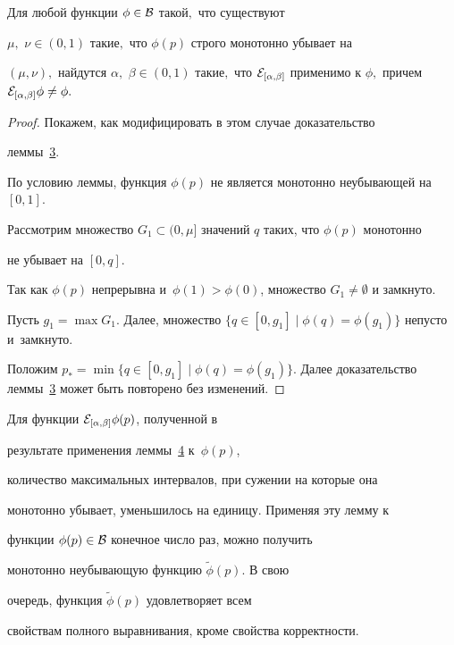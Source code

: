 \smallskip



\hypertarget{palin:lemma4}{}



\begin{lemma}[4]Для любой функции $\phi\in{\cal B}$ такой$,$ что существуют

$\mu,$ $\nu\in(0,1)$ такие$,$ что $\phi(p)$ строго монотонно убывает на

$(\mu,\nu),$ найдутся $\alpha,$ $\beta\in(0,1)$ такие$,$ что ${\cal E}_{[\alpha,\beta]}$ применимо к $\phi,$ причем ${\cal E}_{[\alpha,\beta]}\phi\ne\phi.$

\end{lemma}



\smallskip



\begin{proof} Покажем, как модифицировать в этом случае доказательство

леммы~\hyperlink{palin:lemma3}{3}. 

По условию леммы, функция $\phi(p)$ не является монотонно неубывающей на $[0,1]$. 

Рассмотрим множество $G_1\subset(0,\mu]$ значений $q$ таких, что $\phi(p)$ монотонно

не убывает на $[0,q]$. 

Так как $\phi(p)$ непрерывна и~$\phi(1)>\phi(0)$, множество $G_1\ne\emptyset$ и замкнуто. 



Пусть $g_1=\max G_1$. Далее, множество $\{q\in[0,g_1]\mid \phi(q)=\phi(g_1)\}$ непусто и~замкнуто. 

Положим $p_*=\min\{q\in[0,g_1]\mid \phi(q)=\phi(g_1)\}$. Далее доказательство леммы~\hyperlink{palin:lemma3}{3} может быть повторено без изменений. \hfill

\end{proof}



\smallskip



\hypertarget{palin:remark2}{}



\begin{remark}[2]

Для функции ${\cal E}_{[\alpha,\beta]}\phi(p)$, полученной в

результате применения леммы~\hyperlink{palin:lemma4}{4} к~$\phi(p)$,

количество максимальных интервалов, при сужении на которые она

монотонно убывает, уменьшилось на единицу. Применяя эту лемму к

функции $\phi(p)\in{\cal B}$ конечное число раз, можно получить

монотонно неубывающую функцию $\widetilde{\phi}(p)$. В свою

очередь, функция $\widetilde{\phi}(p)$ удовлетворяет всем

свойствам полного выравнивания, кроме свойства корректности.

\end{remark}



